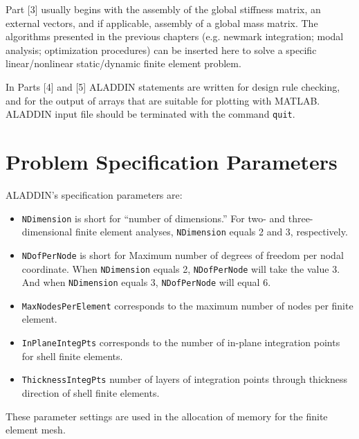 \vspace{0.15 in}
\noindent\hspace{0.5 in}
Part [3] usually begins with the assembly of the
global stiffness matrix, an external vectors,
and if applicable, assembly of a global mass matrix.
The algorithms presented in the previous chapters (e.g.
newmark integration; modal analysis; optimization procedures)
can be inserted here to solve a specific linear/nonlinear
static/dynamic finite element problem.

\vspace{0.15 in}
\noindent\hspace{0.5 in}
In Parts [4] and [5] ALADDIN statements
are written for design rule checking,
and for the output of arrays that are suitable for plotting with MATLAB.
ALADDIN input file should be
terminated with the command {\tt quit}.

\clearpage
\section{Problem Specification Parameters}

\vspace{0.15 in}\noindent
ALADDIN's specification parameters are:

\begin{itemize}
\item{}
{\tt NDimension} is short for ``number of dimensions.''
For two- and three-dimensional finite element analyses,
{\tt NDimension} equals 2 and 3, respectively.
\item{}
{\tt NDofPerNode} is short for Maximum number of degrees of
freedom per nodal coordinate.
When {\tt NDimension} equals 2, {\tt NDofPerNode} will take the value 3.
And when {\tt NDimension} equals 3, {\tt NDofPerNode} will equal 6.
\item{}
{\tt MaxNodesPerElement} corresponds to the
maximum number of nodes per finite element.
\item{}
{\tt InPlaneIntegPts} corresponds to the number of
in-plane integration points for shell finite elements.
\item{}
{\tt ThicknessIntegPts} number of layers of integration
points through thickness direction of shell finite elements.
\end{itemize}

\vspace{0.10 in}\noindent
These parameter settings are used in the allocation of
memory for the finite element mesh.


